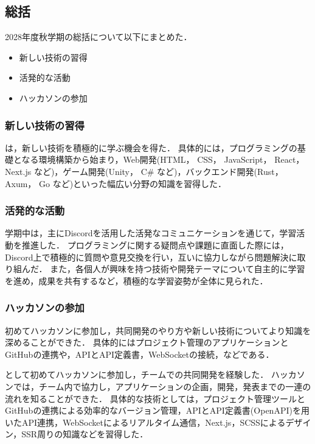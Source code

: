 \subsection*{\firstGrade{}総括}


2028年度秋学期の\firstGrade{}総括について以下にまとめた．

\begin{itemize}
	\item 新しい技術の習得
	\item 活発的な活動
	\item ハッカソンの参加
\end{itemize}

\subsubsection*{新しい技術の習得}

\firstGrade{}は，新しい技術を積極的に学ぶ機会を得た．
具体的には，プログラミングの基礎となる環境構築から始まり，Web開発(HTML， CSS， JavaScript， React， Next.js など)，ゲーム開発(Unity， C\# など)，バックエンド開発(Rust， Axum， Go など)といった幅広い分野の知識を習得した．

\subsubsection*{活発的な活動}

学期中は，主にDiscordを活用した活発なコミュニケーションを通じて，学習活動を推進した．
プログラミングに関する疑問点や課題に直面した際には，Discord上で積極的に質問や意見交換を行い，互いに協力しながら問題解決に取り組んだ．
また，各個人が興味を持つ技術や開発テーマについて自主的に学習を進め，成果を共有するなど，積極的な学習姿勢が全体に見られた．

\subsubsection*{ハッカソンの参加}
初めてハッカソンに参加し，共同開発のやり方や新しい技術についてより知識を深めることができた．
具体的にはプロジェクト管理のアプリケーションとGitHubの連携や，APIとAPI定義書，WebSocketの接続，などである．

\firstGrade{}として初めてハッカソンに参加し，チームでの共同開発を経験した．
ハッカソンでは，チーム内で協力し，アプリケーションの企画，開発，発表までの一連の流れを知ることができた．
具体的な技術としては，プロジェクト管理ツールとGitHubの連携による効率的なバージョン管理，APIとAPI定義書(OpenAPI)を用いたAPI連携，WebSocketによるリアルタイム通信，Next.js，SCSSによるデザイン，SSR周りの知識などを習得した．
